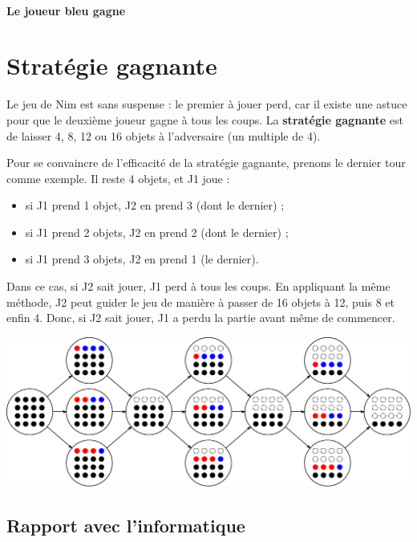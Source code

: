 \documentclass[a5paper,pagesize,DIV=14]{scrbook}
\begin{document}
\bigskip
\bigskip
\bigskip

\begin{center}
 \\
\textbf{Le joueur bleu gagne}
\end{center}

\newpage

\section*{Stratégie gagnante}

Le jeu de Nim est sans suspense : le premier à jouer perd, car il existe une
astuce pour que le deuxième joueur gagne à tous les coups. La \textbf{stratégie
  gagnante} est de laisser 4, 8, 12 ou 16 objets à l'adversaire (un multiple de
4).

Pour se convaincre de l'efficacité de la stratégie gagnante, prenons le dernier
tour comme exemple. Il reste 4 objets, et J1 joue :

\begin{itemize}
  \item si J1 prend 1 objet, J2 en prend 3 (dont le dernier) ;
  \item si J1 prend 2 objets, J2 en prend 2 (dont le dernier) ;
  \item si J1 prend 3 objets, J2 en prend 1 (le dernier).
\end{itemize}        

Dans ce cas, si J2 sait jouer, J1 perd à tous les coups. En appliquant la même
méthode, J2 peut guider le jeu de manière à passer de 16 objets à 12, puis 8 et
enfin 4. Donc, si J2 sait jouer, J1 a perdu la partie avant même de commencer.

\begin{center}
  \includegraphics[width=\linewidth]{nim/nim16.pdf}
\end{center}

\subsection*{Rapport avec l'informatique}
\end{document}
